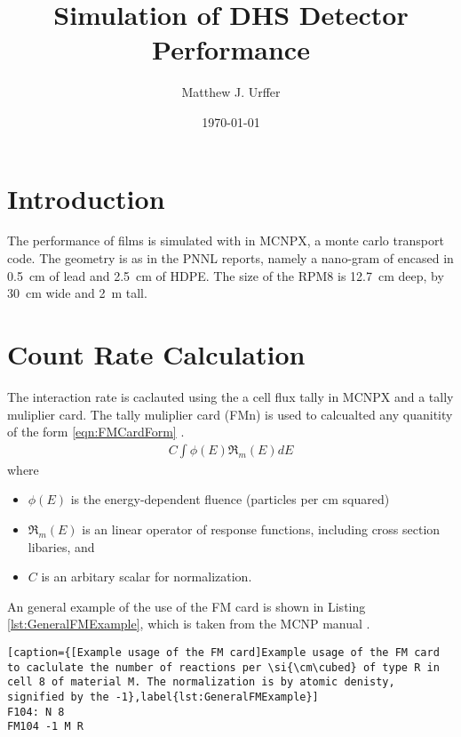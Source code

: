 \documentclass[draftcls,onecolumn]{IEEEtran}
\begin{document}
\title{Simulation of DHS Detector Performance}
\author{Matthew J. Urffer}
\date{\today}
\maketitle

\printnomenclature
\printindex

\listoftodos
\tableofcontents
\listoffigures
\listoftables
\lstlistoflistings
\section{Introduction}

The performance of films is simulated with in MCNPX, a monte carlo transport code\cite{pelowitz_mcnpx_????}.
The geometry is as in the PNNL reports, namely a nano-gram of   encased in \SI{0.5}{\cm} of lead and \SI{2.5}{\cm} of HDPE. 
The size of the RPM8 is \SI{12.7}{\cm} deep, by \SI{30}{\cm} wide and \SI{2}{\m} tall.

\section{Count Rate Calculation}
The interaction rate is caclauted using the a cell flux tally in MCNPX and a tally muliplier card.
The tally muliplier card (FMn) is used to calcualted any quanitity of the form \eqref{eqn:FMCardForm} \cite{pelowitz_mcnpx_????}.
\begin{align}
  \label{eqn:FMCardForm}
  C\int\phi(E)\Re_m(E)dE
\end{align}
where
\begin{itemize}
  \item [] $\phi(E)$ is the energy-dependent fluence (particles per cm squared) 
  \item [] $\Re_m (E)$ is an linear operator of response functions, including cross section libaries, and
  \item [] $C$ is an arbitary scalar for normalization.
\end{itemize}
An general example of the use of the FM card is shown in Listing \ref{lst:GeneralFMExample}, which is taken from the MCNP manual \cite{pelowitz_mcnpx_????}.
\begin{lstlisting}[caption={[Example usage of the FM card]Example usage of the FM card to caclulate the number of reactions per \si{\cm\cubed} of type R in cell 8 of material M. The normalization is by atomic denisty, signified by the -1},label{lst:GeneralFMExample}]
F104: N 8
FM104 -1 M R
\end{lstlisting}
\end{document}
